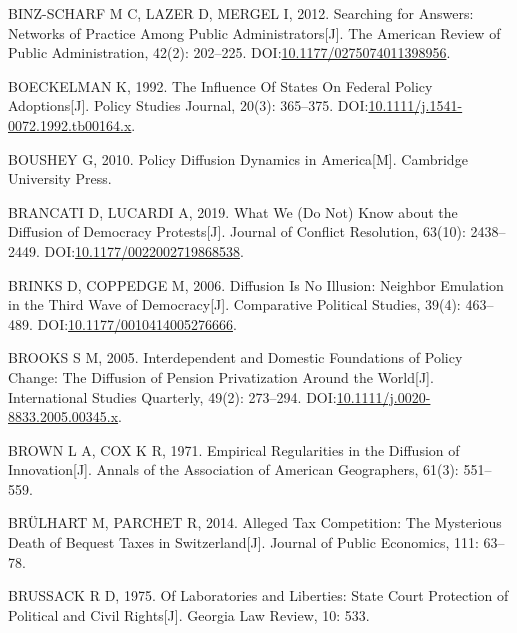 \documentclass[
  12pt,
]{ctexart}
\newlength{\cslhangindent}
\newlength{\cslentryspacingunit} %
\newenvironment{CSLReferences}[2] %
 {%
  \setlength{\parindent}{0pt}
  \ifodd #1
  \let\oldpar\par
  \def\par{\hangindent=\cslhangindent\oldpar}
  \fi
  \setlength{\parskip}{#2\cslentryspacingunit}
 }%
 {}
\begin{document}
\begin{CSLReferences}{1}{0}
\leavevmode{}%
BINZ-SCHARF M C, LAZER D, MERGEL I, 2012. Searching for {Answers}: {Networks} of {Practice Among Public Administrators}{[}J{]}. The American Review of Public Administration, 42(2): 202--225. DOI:\href{https://doi.org/10.1177/0275074011398956}{10.1177/0275074011398956}.

\leavevmode{}%
BOECKELMAN K, 1992. The {Influence Of States On Federal Policy Adoptions}{[}J{]}. Policy Studies Journal, 20(3): 365--375. DOI:\href{https://doi.org/10.1111/j.1541-0072.1992.tb00164.x}{10.1111/j.1541-0072.1992.tb00164.x}.

\leavevmode{}%
BOUSHEY G, 2010. Policy Diffusion Dynamics in {America}{[}M{]}. {Cambridge University Press}.

\leavevmode{}%
BRANCATI D, LUCARDI A, 2019. What {We} ({Do Not}) {Know} about the {Diffusion} of {Democracy Protests}{[}J{]}. Journal of Conflict Resolution, 63(10): 2438--2449. DOI:\href{https://doi.org/10.1177/0022002719868538}{10.1177/0022002719868538}.

\leavevmode{}%
BRINKS D, COPPEDGE M, 2006. Diffusion {Is No Illusion}: {Neighbor Emulation} in the {Third Wave} of {Democracy}{[}J{]}. Comparative Political Studies, 39(4): 463--489. DOI:\href{https://doi.org/10.1177/0010414005276666}{10.1177/0010414005276666}.

\leavevmode{}%
BROOKS S M, 2005. Interdependent and {Domestic Foundations} of {Policy Change}: {The Diffusion} of {Pension Privatization Around} the {World}{[}J{]}. International Studies Quarterly, 49(2): 273--294. DOI:\href{https://doi.org/10.1111/j.0020-8833.2005.00345.x}{10.1111/j.0020-8833.2005.00345.x}.

\leavevmode{}%
BROWN L A, COX K R, 1971. Empirical Regularities in the Diffusion of Innovation{[}J{]}. Annals of the Association of American Geographers, 61(3): 551--559.

\leavevmode{}%
BRÜLHART M, PARCHET R, 2014. Alleged Tax Competition: {The} Mysterious Death of Bequest Taxes in {Switzerland}{[}J{]}. Journal of Public Economics, 111: 63--78.

\leavevmode{}%
BRUSSACK R D, 1975. Of {Laboratories} and {Liberties}: {State Court Protection} of {Political} and {Civil Rights}{[}J{]}. Georgia Law Review, 10: 533.


\end{CSLReferences}
\end{document}
